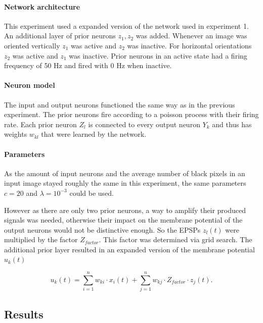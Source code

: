 \paragraph{Network architecture}

This experiment used a expanded version of the network used in experiment 1. An additional layer of prior neurons $z_1,z_2$ was added. Whenever an image was oriented vertically $z_1$ was active and $z_2$ was inactive. For horizontal orientations $z_2$ was active and $z_1$ was inactive. Prior neurons in an active state had a firing frequency of 50 Hz and fired with 0 Hz when inactive.

\paragraph{Neuron model}
The input and output neurons functioned the same way as in the previous experiment. The prior neurons fire according to a poisson process with their firing rate. Each prior neuron $Z_l$ is connected to every output neuron $Y_k$ and thus has weights $w_{kl}$ that were learned by the network. 

\paragraph{Parameters}
As the amount of input neurons and the average number of black pixels in an input image stayed roughly the same in this experiment, the same parameters $c=  20$ and $\lambda = 10^{-3}$ could be used.

 However as there are only two prior neurons, a way to amplify their produced signals was needed, otherwise their impact on the membrane potential of the output neurons would not be distinctive enough. So the EPSPs $z_l(t)$ were multiplied by the factor $Z_{factor}$. This factor was determined via grid search. The additional prior layer resulted in an expanded version of the membrane potential $u_k(t)$

\begin{equation}
\label{eqn:ukHorvert}
u_k(t) = \sum_{i=1}^n w_{ki} \cdot x_i(t) + \sum_{j=1}^n w_{kj} \cdot Z_{factor} \cdot z_j(t).
\end{equation}


\subsection{Results} 

